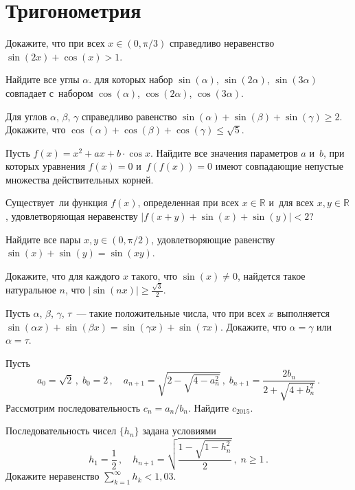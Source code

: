
\section*{Тригонометрия}


\begin{problems}

\item
Докажите, что при всех $x \in (0, \mathrm{\pi} / 3)$ справедливо неравенство
\(
    \sin(2 x) + \cos(x) > 1
\).

\item
Найдите все углы $\alpha$. для которых набор
$\sin(\alpha)$, $\sin(2 \alpha)$, $\sin(3 \alpha)$ совпадает с~набором
$\cos(\alpha)$, $\cos(2 \alpha)$, $\cos(3 \alpha)$.

\item
Для углов $\alpha$, $\beta$, $\gamma$ справедливо равенство
\(
    \sin(\alpha) + \sin(\beta) + \sin(\gamma)
\geq
    2
\).
Докажите, что
\(
    \cos(\alpha) + \cos(\beta) + \cos(\gamma)
\leq
    \sqrt{5}
\).

\item
Пусть $f(x) = x^2 + a x + b \cdot \cos{x}$.
Найдите все значения параметров $a$ и~$b$, при которых уравнения
$f(x) = 0$ и~$f(f(x)) = 0$ имеют совпадающие непустые множества действительных
корней.

\item
Существует~ли функция $f(x)$, определенная при всех $x \in \mathbb{R}$
и~для всех $x, y \in \mathbb{R}$, удовлетворяющая неравенству
\(
    \lvert f(x + y) + \sin(x) + \sin(y) \rvert
<
    2
\)?

\item
Найдите все пары $x, y \in (0, \mathrm{\pi} / 2)$, удовлетворяющие равенству
\(
    \sin(x) + \sin(y) = \sin(x y)
\).

\item
Докажите, что для каждого $x$ такого, что $\sin(x) \neq 0$, найдется
такое натуральное $n$, что
\(
    \lvert \sin(nx) \rvert
\geq
    \frac{\sqrt{3}}{2}
\).

\item
Пусть $\alpha$, $\beta$, $\gamma$, $\tau$~— такие положительные
числа, что при всех $x$ выполняется
\(
    \sin(\alpha x) + \sin(\beta x)
=
    \sin(\gamma x) + \sin(\tau x)
\).
Докажите, что $\alpha = \gamma$ или $\alpha = \tau$.

\item
Пусть
\[
    a_0 = \sqrt{2}
\, , \;
    b_0 = 2
\, , \quad
    a_{n+1} = \sqrt{2 - \sqrt{4 - a^2_n}}
\, , \;
    b_{n+1} = \frac{2 b_n}{2 + \sqrt{4 + b^2_n}}
\, . \]
Рассмотрим последовательность $c_n = a_n / b_n$.
Найдите $c_{2015}$.

\item
Последовательность чисел $\{ h_n \}$ задана условиями
\[
    h_1 = \frac{1}{2}
\, , \quad
    h_{n+1} = \sqrt{\frac{1 - \sqrt{1 - h_n^2}}{2}}
\, , \;
    n \geq 1
\, . \]
Докажите неравенство
\(
    \sum_{k=1}^\infty
        h_k
<
    1{,}03
\).

\end{problems}

